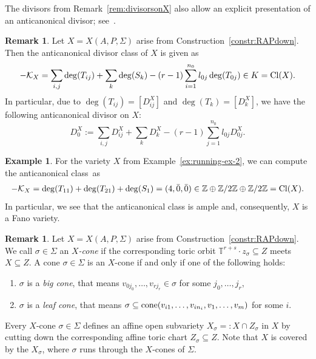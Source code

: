 \documentclass[pdftex]{sigma}%
\theoremstyle{definition}
\newtheorem{exam}[thm]{Example}
\newtheorem{rema}[thm]{Remark}
\def\Cl{{\rm Cl}}
\def\TT{{\mathbb T}}
\def\ZZ{{\mathbb Z}}
\def\cone{{\rm cone}}
\numberwithin{equation}{section}
\begin{document}
The divisors from Remark~\ref{rem:divisorsonX}
also allow an explicit presentation of an anticanonical
divisor; see~\cite[Proposition~3.4.4.1]{ArDeHaLa}.

\begin{rema}
\label{rem:anticanclass}
Let $X = X(A,P,\Sigma)$ arise from
Construction~\ref{constr:RAPdown}.
Then the anticanonical divisor
class of $X$ is given as
\[
- \mathcal{K}_X =
\sum_{i,j} \deg(T_{ij}) + \sum_k \deg(S_k)-
(r-1) \sum_{i=1}^{n_0} l_{0j} \deg(T_{0j})
 \in K =\Cl(X).
\]
In particular, due to $\deg(T_{ij}) = [D^X_{ij}]$
and $\deg(T_k) = [D^X_k]$, we have the
following anticanonical divisor on $X$:
\[
D^X_0
 :=
\sum_{i,j} D^X_{ij} + \sum_k D^X_k
- (r-1) \sum_{j=1}^{n_0} l_{0 j} D^X_{0 j}.
\]
\end{rema}


\begin{exam}
For the variety $X$ from Example~\ref{ex:running-ex-2},
we can compute the anticanonical class~as
\begin{gather*}
- \mathcal{K}_X =
\deg(T_{11})+\deg(T_{21})+\deg(S_1) =
(4,\bar 0, \bar 0) \in
\ZZ \oplus \ZZ/2\ZZ \oplus \ZZ/2\ZZ =\Cl(X).
\end{gather*}
In particular, we see that the anticanonical class
is ample and, consequently, $X$ is a Fano variety.
\end{exam}


\begin{rema}
Let $X = X(A,P,\Sigma)$ arise from
Construction~\ref{constr:RAPdown}.
We call $\sigma \in \Sigma$ an \emph{$X$-cone}
if the corresponding toric
orbit $\TT^{r+s} \cdot z_\sigma \subseteq Z$
meets $X \subseteq Z$.
A cone $\sigma \in \Sigma$ is an $X$-cone
if and only if one of the following holds:
\begin{enumerate}\itemsep=0pt
\item[$(i)$]
$\sigma$ is a \emph{big cone}, that means
$v_{0j_0}, \dots, v_{rj_r} \in \sigma$
for some $j_0, \dots, j_r$,
\item[$(ii)$]
$\sigma$ is a \emph{leaf cone}, that means
$\sigma \subseteq \cone(v_{i1}, \dots, v_{in_i},v_1,\dots,v_m)$
for some $i$.
\end{enumerate}
Every $X$-cone $\sigma \in \Sigma$ defines an affine
open subvariety $X_\sigma =: X \cap Z_\sigma$
in $X$ by cutting down the corresponding affine toric
chart $Z_\sigma \subseteq Z$.
Note that $X$ is covered by the $X_\sigma$, where $\sigma$ runs
through the $X$-cones of $\Sigma$.
\end{rema}
\end{document}

